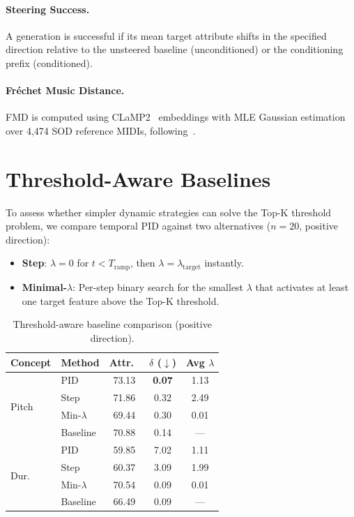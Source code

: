 \documentclass{article}
\theoremstyle{plain}
\begin{document}
\paragraph{Steering Success.}
A generation is successful if its mean target attribute shifts in the specified direction relative to the unsteered baseline (unconditioned) or the conditioning prefix (conditioned).

\paragraph{Fr\'{e}chet Music Distance.}
FMD is computed using CLaMP2~\cite{wu2024clamp2} embeddings with MLE Gaussian estimation over 4,474 SOD reference MIDIs, following~\citet{wu2024fmd}.

\section{Threshold-Aware Baselines}
\label{app:threshold_baselines}

To assess whether simpler dynamic strategies can solve the Top-K threshold problem, we compare temporal PID against two alternatives ($n{=}20$, positive direction):

\begin{itemize}
    \item \textbf{Step}: $\lambda{=}0$ for $t < T_\text{ramp}$, then $\lambda{=}\lambda_\text{target}$ instantly.
    \item \textbf{Minimal-$\lambda$}: Per-step binary search for the smallest $\lambda$ that activates at least one target feature above the Top-K threshold.
\end{itemize}

\begin{table}[h]
  \caption{Threshold-aware baseline comparison (positive direction).}
  \label{tab:threshold}
  \begin{center}
  \begin{small}
  \begin{tabular}{llccc}
    \toprule
    Concept & Method & Attr.\ & $\delta$ ($\downarrow$) & Avg $\lambda$ \\
    \midrule
    \multirow{4}{*}{Pitch} & PID & 73.13 & \textbf{0.07} & 1.13 \\
    & Step & 71.86 & 0.32 & 2.49 \\
    & Min-$\lambda$ & 69.44 & 0.30 & 0.01 \\
    & Baseline & 70.88 & 0.14 & --- \\
    \midrule
    \multirow{4}{*}{Dur.} & PID & 59.85 & 7.02 & 1.11 \\
    & Step & 60.37 & 3.09 & 1.99 \\
    & Min-$\lambda$ & 70.54 & 0.09 & 0.01 \\
    & Baseline & 66.49 & 0.09 & --- \\
    \bottomrule
  \end{tabular}
  \end{small}
  \end{center}
\end{table}
\end{document}
